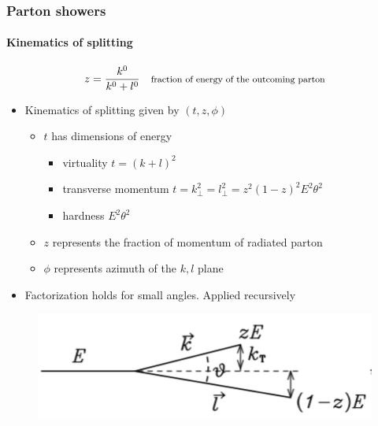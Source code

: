 \documentclass[aspectratio=43]{beamer}
\begin{document}
\begin{frame}

	\frametitle{Parton showers}
	\framesubtitle{Kinematics of splitting}
	
	\begin{equation}
		z = \frac{k^{0}}{k^{0} + l^{0}} \textrm{\quad \footnotesize fraction of energy of the outcoming parton} \nonumber
	\end{equation}
	
	\begin{itemize} 
		\item Kinematics of splitting given by $(t, z, \phi)$
		\begin{itemize}
			\item $t$ has dimensions of energy
			\begin{itemize}
				\item virtuality $t = (k + l)^{2}$
				\item transverse momentum $t = k_{\perp}^{2} = l_{\perp}^{2} = z^{2}(1 - z)^{2}E^{2}\theta^{2}$
				\item hardness $E^{2}\theta^{2}$
			\end{itemize}
			\item $z$ represents the fraction of momentum of radiated parton
			\item $\phi$ represents azimuth of the $k, l$ plane
		\end{itemize}
	
	\vspace{0.5cm}
	
		\item Factorization holds for small angles. Applied recursively
	\end{itemize}
	
	\begin{figure}
		\includegraphics[width = 5 cm]{plots/shower_5.png}
	\end{figure}
	
\end{frame}
\end{document}
